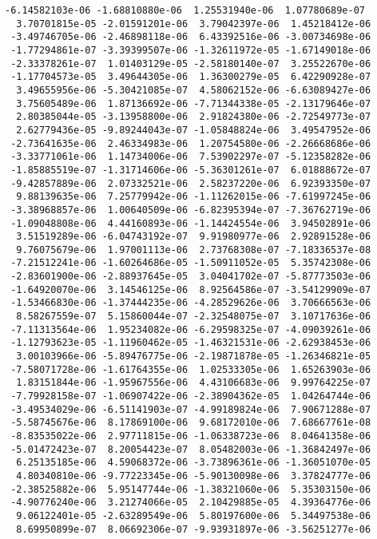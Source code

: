 \documentclass[11pt]{article}
\begin{document}
\begin{Verbatim}[commandchars=\\\{\}]
 -6.14582103e-06 -1.68810880e-06  1.25531940e-06  1.07780689e-07
  3.70701815e-05 -2.01591201e-06  3.79042397e-06  1.45218412e-06
 -3.49746705e-06 -2.46898118e-06  6.43392516e-06 -3.00734698e-06
 -1.77294861e-07 -3.39399507e-06 -1.32611972e-05 -1.67149018e-06
 -2.33378261e-07  1.01403129e-05 -2.58180140e-07  3.25522670e-06
 -1.17704573e-05  3.49644305e-06  1.36300279e-05  6.42290928e-07
  3.49655956e-06 -5.30421085e-07  4.58062152e-06 -6.63089427e-06
  3.75605489e-06  1.87136692e-06 -7.71344338e-05 -2.13179646e-07
  2.80385044e-05 -3.13958800e-06  2.91824380e-06 -2.72549773e-07
  2.62779436e-05 -9.89244043e-07 -1.05848824e-06  3.49547952e-06
 -2.73641635e-06  2.46334983e-06  1.20754580e-06 -2.26668686e-06
 -3.33771061e-06  1.14734006e-06  7.53902297e-07 -5.12358282e-06
 -1.85885519e-07 -1.31714606e-06 -5.36301261e-07  6.01888672e-07
 -9.42857889e-06  2.07332521e-06  2.58237220e-06  6.92393350e-07
  9.88139635e-06  7.25779942e-06 -1.11262015e-06 -7.61997245e-06
 -3.38968857e-06  1.00640509e-06 -6.82395394e-07 -7.36762719e-06
 -1.09048808e-06  4.44160893e-06 -1.14424554e-06  3.94502891e-06
  3.51519289e-06 -6.04743192e-07  9.91980977e-06  2.92891528e-06
  9.76075679e-06  1.97001113e-06  2.73768308e-07 -7.18336537e-08
 -7.21512241e-06 -1.60264686e-05 -1.50911052e-05  5.35742308e-06
 -2.83601900e-06 -2.88937645e-05  3.04041702e-07 -5.87773503e-06
 -1.64920070e-06  3.14546125e-06  8.92564586e-07 -3.54129909e-07
 -1.53466830e-06 -1.37444235e-06 -4.28529626e-06  3.70666563e-06
  8.58267559e-07  5.15860044e-07 -2.32548075e-07  3.10717636e-06
 -7.11313564e-06  1.95234082e-06 -6.29598325e-07 -4.09039261e-06
 -1.12793623e-05 -1.11960462e-05 -1.46321531e-06 -2.62938453e-06
  3.00103966e-06 -5.89476775e-06 -2.19871878e-05 -1.26346821e-05
 -7.58071728e-06 -1.61764355e-06  1.02533305e-06  1.65263903e-06
  1.83151844e-06 -1.95967556e-06  4.43106683e-06  9.99764225e-07
 -7.79928158e-07 -1.06907422e-06 -2.38904362e-05  1.04264744e-06
 -3.49534029e-06 -6.51141903e-07 -4.99189824e-06  7.90671288e-07
 -5.58745676e-06  8.17869100e-06  9.68172010e-06  7.68667761e-08
 -8.83535022e-06  2.97711815e-06 -1.06338723e-06  8.04641358e-06
 -5.01472423e-07  8.20054423e-07  8.05482003e-06 -1.36842497e-06
  6.25135185e-06  4.59068372e-06 -3.73896361e-06 -1.36051070e-05
  4.80340810e-06 -9.77223345e-06 -5.90130098e-06  3.37824777e-06
 -2.38525882e-06  5.95147744e-06 -1.38321060e-06  5.35303150e-06
 -4.90776240e-06  3.21274066e-05  2.10429885e-05  4.39364776e-06
  9.06122401e-05 -2.63289549e-06  5.80197600e-06  5.34497538e-06
  8.69950899e-07  8.06692306e-07 -9.93931897e-06 -3.56251277e-06

\end{Verbatim}
\end{document}
